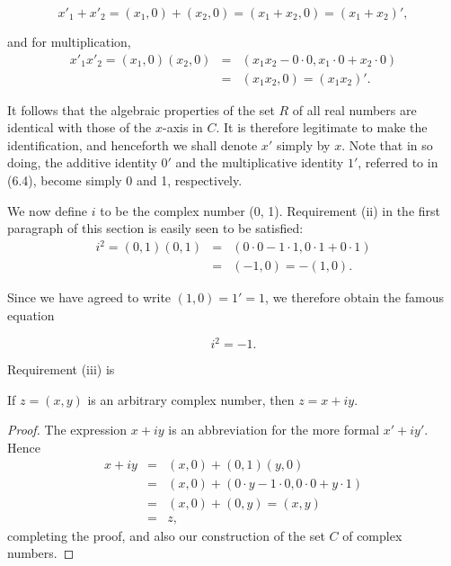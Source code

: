$$
x'_{1} + x'_{2} = (x_{1}, 0) + (x_{2}, 0) = (x_{1} + x_{2}, 0) = (x_{1} + x_{2})', 
$$

\noindent and for multiplication, 
\begin{eqnarray*}
x'_{1}x'_{2} = (x_{1}, 0)(x_{2}, 0) &=& (x_{1}x_{2} - 0 \cdot 0, x_{1} \cdot 0 + x_{2} \cdot 0)\\
                                                    &=& (x_{1}x_{2}, 0) = (x_{1}x_{2})'.
\end{eqnarray*}

\noindent It follows that the algebraic properties of the set $R$ of all real numbers are identical with those of the $x$-axis in $C$. It is therefore legitimate to make the identification, and henceforth we shall denote $x'$ simply by $x$. Note that in so doing, the additive identity $0'$ and the multiplicative identity $1'$, referred to in (6.4), become simply 0 and 1, respectively.

We now define $i$ to be the complex number (0, 1). Requirement (ii) in the first paragraph of
this section is easily seen to be satisfied:
\begin{eqnarray*}
i^2 = (0, 1)(0, 1) &=& (0 \cdot 0 - 1 \cdot 1, 0 \cdot 1 + 0 \cdot 1)\\
                          &=& (-1,0) = - (1,0).
\end{eqnarray*}

\noindent Since we have agreed to write $(1, 0) = 1' = 1$, we therefore obtain the famous equation

\begin{theorem} %
$$
i^2 = -1.
$$
\end{theorem}

Requirement (iii) is

\begin{theorem} %
If $z = (x, y)$ is an arbitrary complex number, then $z = x + iy$.
\end{theorem}


\begin{proof}
The expression $x + iy$ is an abbreviation for the more formal $x' + iy'$. Hence
\begin{eqnarray*}
x + iy &=& (x, 0) + (0, 1)(y, 0) \\
         &=& (x, 0)+ (0 \cdot y - 1 \cdot 0, 0 \cdot 0 + y \cdot 1) \\
         &=& (x, 0) + (0, y) = (x, y) \\
         &=& z,
\end{eqnarray*}
completing the proof, and also our construction of the set $C$ of complex numbers.
\end{proof}

